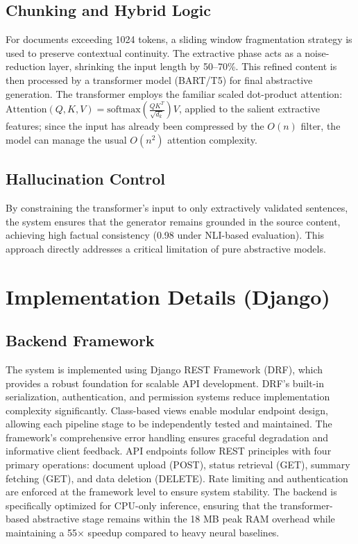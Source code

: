 \documentclass[conference]{IEEEtran}
\begin{document}
\subsection{Chunking and Hybrid Logic}

For documents exceeding 1024 tokens, a sliding window fragmentation strategy is used to preserve contextual continuity. The extractive phase acts as a noise-reduction layer, shrinking the input length by 50--70\%. This refined content is then processed by a transformer model (BART/T5) for final abstractive generation. The transformer employs the familiar scaled dot-product attention: \(\text{Attention}(Q,K,V)=\text{softmax}\left(\frac{QK^{T}}{\sqrt{d_k}}\right)V\), applied to the salient extractive features; since the input has already been compressed by the \(O(n)\) filter, the model can manage the usual \(O(n^{2})\) attention complexity.

\subsection{Hallucination Control}

By constraining the transformer's input to only extractively validated sentences, the system ensures that the generator remains grounded in the source content, achieving high factual consistency (0.98 under NLI-based evaluation). This approach directly addresses a critical limitation of pure abstractive models.

\section{Implementation Details (Django)}

\subsection{Backend Framework}

The system is implemented using Django REST Framework (DRF), which provides a robust foundation for scalable API development. DRF's built-in serialization, authentication, and permission systems reduce implementation complexity significantly. Class-based views enable modular endpoint design, allowing each pipeline stage to be independently tested and maintained. The framework's comprehensive error handling ensures graceful degradation and informative client feedback. API endpoints follow REST principles with four primary operations: document upload (POST), status retrieval (GET), summary fetching (GET), and data deletion (DELETE). Rate limiting and authentication are enforced at the framework level to ensure system stability. The backend is specifically optimized for CPU-only inference, ensuring that the transformer-based abstractive stage remains within the 18 MB peak RAM overhead while maintaining a 55× speedup compared to heavy neural baselines.
\end{document}
